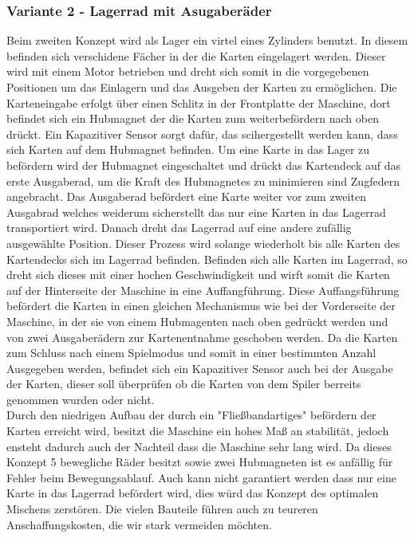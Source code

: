 \subsubsection{Variante 2 - Lagerrad mit Asugaberäder}

Beim zweiten Konzept wird als Lager ein virtel eines Zylinders benutzt. In diesem befinden
sich verschidene Fächer in der die Karten eingelagert werden. Dieser wird mit einem Motor betrieben
und dreht sich somit in die vorgegebenen Positionen um das Einlagern und das Ausgeben der Karten zu ermöglichen.
Die Karteneingabe erfolgt über einen Schlitz in der Frontplatte der Maschine, dort befindet sich ein Hubmagnet der die Karten
zum weiterbefördern nach oben drückt. Ein Kapazitiver Sensor sorgt dafür, das scihergestellt werden kann, dass sich Karten auf dem Hubmagnet befinden.
Um eine Karte in das Lager zu befördern wird der Hubmagnet eingeschaltet und drückt das Kartendeck auf das erste Ausgaberad, um die Kraft des Hubmagnetes zu minimieren sind Zugfedern angebracht.
Das Ausgaberad befördert eine Karte weiter vor zum zweiten Ausgabrad welches weiderum sicherstellt das nur eine Karten in das Lagerrad transportiert wird.
Danach dreht das Lagerrad auf eine andere zufällig ausgewählte Position. Dieser Prozess wird solange wiederholt bis alle Karten des Kartendecks sich im Lagerrad befinden.
Befinden sich alle Karten im Lagerrad, so dreht sich dieses mit einer hochen Geschwindigkeit und wirft somit die Karten auf der Hinterseite der Maschine in eine Auffangführung. %
Diese Auffangsführung befördert die Karten in einen gleichen Mechanismus wie bei der Vorderseite der Maschine, in der sie von einem Hubmagenten nach oben gedrückt werden und von zwei Ausgaberädern zur
Kartenentnahme geschoben werden. Da die Karten zum Schluss nach einem Spielmodus und somit in einer bestimmten Anzahl Ausgegeben werden, befindet sich ein Kapazitiver Sensor auch bei der Ausgabe der Karten,
dieser soll überprüfen ob die Karten von dem Spiler berreits genommen wurden oder nicht.\\

Durch den niedrigen Aufbau der durch ein "Fließbandartiges" befördern der Karten erreicht wird, besitzt die Maschine ein hohes Maß an stabilität, jedoch ensteht dadurch auch der Nachteil
dass die Maschine sehr lang wird. Da dieses Konzept 5 bewegliche Räder besitzt sowie zwei Hubmagneten ist es anfällig für Fehler beim Bewegungsablauf. Auch kann nicht garantiert werden
dass nur eine Karte in das Lagerrad befördert wird, dies würd das Konzept des optimalen Mischens zerstören. Die vielen Bauteile führen auch zu teureren Anschaffungskosten, die wir stark vermeiden möchten.\\

